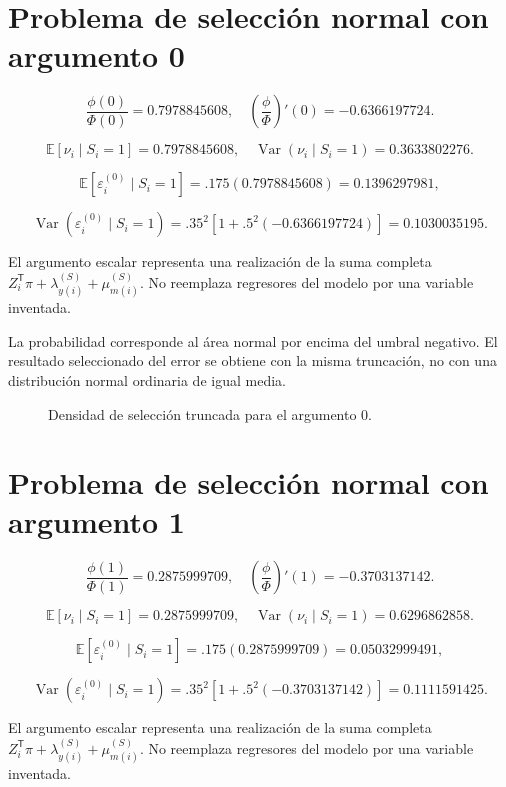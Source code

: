 \documentclass[11pt,a4paper]{article}
\newcommand{\E}{\mathbb E}
\DeclareMathOperator{\Var}{Var}
\begin{document}
\clearpage
\section{Problema de selección normal con argumento 0}

\[
\frac{\phi(0)}{\Phi(0)}=0.7978845608,\quad
\left(\frac{\phi}{\Phi}\right)'(0)=-0.6366197724.
\]

\[
\E[\nu_i\mid S_i=1]=0.7978845608,\quad
\Var(\nu_i\mid S_i=1)=0.3633802276.
\]

\[
\E[\varepsilon_i^{(0)}\mid S_i=1]=.175(0.7978845608)=0.1396297981,
\]

\[
\Var(\varepsilon_i^{(0)}\mid S_i=1)=.35^2[1+.5^2(-0.6366197724)]=0.1030035195.
\]

El argumento escalar representa una realización de la suma completa $Z_i^{\mathsf T}\pi+\lambda_{y(i)}^{(S)}+\mu_{m(i)}^{(S)}$. No reemplaza regresores del modelo por una variable inventada.

La probabilidad corresponde al área normal por encima del umbral negativo. El resultado seleccionado del error se obtiene con la misma truncación, no con una distribución normal ordinaria de igual media.
\begin{figure}[H]\centering{}\caption{Densidad de selección truncada para el argumento 0.}\end{figure}

\clearpage
\section{Problema de selección normal con argumento 1}

\[
\frac{\phi(1)}{\Phi(1)}=0.2875999709,\quad
\left(\frac{\phi}{\Phi}\right)'(1)=-0.3703137142.
\]

\[
\E[\nu_i\mid S_i=1]=0.2875999709,\quad
\Var(\nu_i\mid S_i=1)=0.6296862858.
\]

\[
\E[\varepsilon_i^{(0)}\mid S_i=1]=.175(0.2875999709)=0.05032999491,
\]

\[
\Var(\varepsilon_i^{(0)}\mid S_i=1)=.35^2[1+.5^2(-0.3703137142)]=0.1111591425.
\]

El argumento escalar representa una realización de la suma completa $Z_i^{\mathsf T}\pi+\lambda_{y(i)}^{(S)}+\mu_{m(i)}^{(S)}$. No reemplaza regresores del modelo por una variable inventada.
\end{document}
